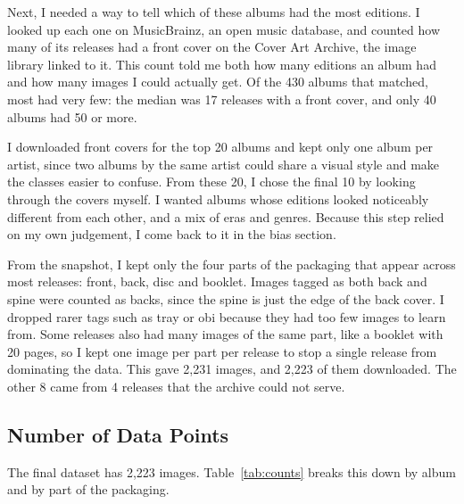 \documentclass[10pt,a4paper,twocolumn]{article}
\begin{document}
Next, I needed a way to tell which of these albums had the most editions. I looked up each one on MusicBrainz, an open music database, and counted how many of its releases had a front cover on the Cover Art Archive, the image library linked to it. This count told me both how many editions an album had and how many images I could actually get. Of the 430 albums that matched, most had very few: the median was 17 releases with a front cover, and only 40 albums had 50 or more.

I downloaded front covers for the top 20 albums and kept only one album per artist, since two albums by the same artist could share a visual style and make the classes easier to confuse. From these 20, I chose the final 10 by looking through the covers myself. I wanted albums whose editions looked noticeably different from each other, and a mix of eras and genres. Because this step relied on my own judgement, I come back to it in the bias section.

From the snapshot, I kept only the four parts of the packaging that appear across most releases: front, back, disc and booklet. Images tagged as both back and spine were counted as backs, since the spine is just the edge of the back cover. I dropped rarer tags such as tray or obi because they had too few images to learn from. Some releases also had many images of the same part, like a booklet with 20 pages, so I kept one image per part per release to stop a single release from dominating the data. This gave 2,231 images, and 2,223 of them downloaded. The other 8 came from 4 releases that the archive could not serve.

\subsection{Number of Data Points}
The final dataset has 2,223 images. Table~\ref{tab:counts} breaks this down by album and by part of the packaging.
\end{document}
